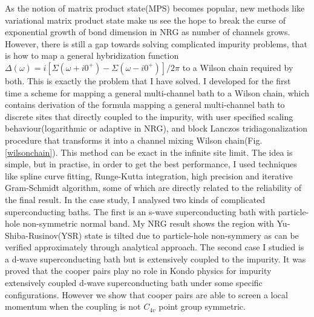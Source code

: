 \documentclass[a4paper]{article}
\newcommand{\<}{\langle}
\renewcommand{\>}{\rangle}
\begin{document}
As the notion of matrix product state(MPS) becomes popular,
new methods like variational matrix product state\cite{Weichselbaum2009}
make us see the hope to break the curse of exponential growth of bond dimension in NRG as number of channels grows.
However, there is still a gap towards solving complicated impurity problems, that is how to map a general hybridization function $\Delta(\omega)= i [\Sigma(\omega+i0^+)-\Sigma(\omega-i0^+) ]/2\pi$ to a Wilson chain required by both.
This is exactly the problem that I have solved.
I developed for the first time a scheme for mapping a general multi-channel bath to a Wilson chain,
which contains derivation of the formula mapping a general multi-channel bath to discrete sites that directly coupled to the impurity, with user specified scaling behaviour(logarithmic or adaptive in NRG),
and block Lanczos tridiagonalization procedure that transforms it into a channel mixing Wilson chain(Fig. \ref{wilsonchain}).
This method can be exact in the infinite site limit.
The idea is simple, but in practise, in order to get the best performance, I used techniques like spline curve fitting, Runge-Kutta integration, high precision and iterative Gram-Schmidt algorithm, some of which are directly related to the reliability of the final result.
In the case study, I analysed two kinds of complicated superconducting baths.
The first is an s-wave superconducting bath with particle-hole non-symmetric normal band.
My NRG result shows the region with Yu-Shiba-Rusinov(YSR) state is tilted due to particle-hole non-symmery as can be verified approximately through analytical approach.\cite{Meng2009}
The second case I studied is a d-wave superconducting bath but is extensively coupled to the impurity.
It was proved that the cooper pairs play no role in Kondo physics for impurity extensively coupled d-wave superconducting bath under some specific configurations.\cite{Fritz2005}
However we show that cooper pairs are able to screen a local momentum when the coupling is not $C_{4v}$ point group symmetric.
\end{document}

